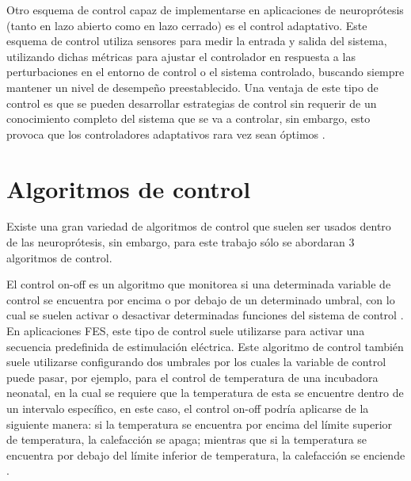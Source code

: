 Otro esquema de control capaz de implementarse en aplicaciones de neuroprótesis (tanto en lazo abierto como en lazo cerrado) es el control adaptativo. Este esquema de control utiliza sensores para medir la entrada y salida del sistema, utilizando dichas métricas para ajustar el controlador en respuesta a las perturbaciones en el entorno de control o el sistema controlado, buscando siempre mantener un nivel de desempeño preestablecido. Una ventaja de este tipo de control es que se pueden desarrollar estrategias de control sin requerir de un conocimiento completo del sistema que se va a controlar, sin embargo, esto provoca que los controladores adaptativos rara vez sean óptimos \cite{Wright2016}.

\section{Algoritmos de control}
Existe una gran variedad de algoritmos de control que suelen ser usados dentro de las neuroprótesis, sin embargo, para este trabajo sólo se abordaran 3 algoritmos de control.

El control on-off es un algoritmo que monitorea si una determinada variable de control se encuentra por encima o por debajo de un determinado umbral, con lo cual se suelen activar o desactivar determinadas funciones del sistema de control \cite{Wright2016}. En aplicaciones FES, este tipo de control suele utilizarse para activar una secuencia predefinida de estimulación eléctrica. Este algoritmo de control también suele utilizarse configurando dos umbrales por los cuales la variable de control puede pasar, por ejemplo, para el control de temperatura de una incubadora neonatal, en la cual se requiere que la temperatura de esta se encuentre dentro de un intervalo específico, en este caso, el control on-off podría aplicarse de la siguiente manera: si la temperatura se encuentra por encima del límite superior de temperatura, la calefacción se apaga; mientras que si la temperatura se encuentra por debajo del límite inferior de temperatura, la calefacción se enciende \cite{Wayne2003}.

